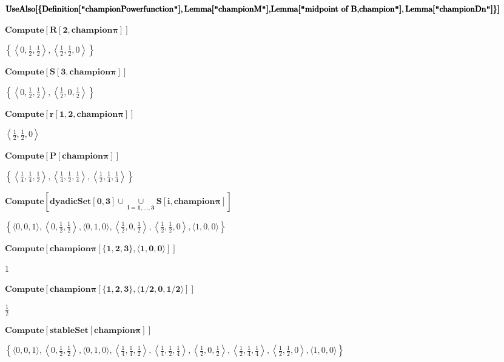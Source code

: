 \documentclass{article}
\begin{document}
\noindent\(\pmb{\text{UseAlso}[\{\text{Definition}[\text{$\texttt{"}$championPowerfunction$\texttt{"}$}],\text{Lemma}[\text{$\texttt{"}$championM$\texttt{"}$}],}\\
\pmb{\text{Lemma}[\text{$\texttt{"}$midpoint of B,champion$\texttt{"}$}],\text{Lemma}[\text{$\texttt{"}$championDn$\texttt{"}$}]\}]}\)

\noindent\(\pmb{\text{Compute}[R[2,\text{champion$\pi $}]]}\)

\noindent\(\left\{\left\langle 0,\frac{1}{2},\frac{1}{2}\right\rangle ,\left\langle \frac{1}{2},\frac{1}{2},0\right\rangle \right\}\)

\noindent\(\pmb{\text{Compute}[S[3,\text{champion$\pi $}]]}\)

\noindent\(\left\{\left\langle 0,\frac{1}{2},\frac{1}{2}\right\rangle ,\left\langle \frac{1}{2},0,\frac{1}{2}\right\rangle \right\}\)

\noindent\(\pmb{\text{Compute}[r[1,2,\text{champion$\pi $}]]}\)

\noindent\(\left\langle \frac{1}{2},\frac{1}{2},0\right\rangle \)

\noindent\(\pmb{\text{Compute}[P[\text{champion$\pi $}]]}\)

\noindent\(\left\{\left\langle \frac{1}{4},\frac{1}{4},\frac{1}{2}\right\rangle ,\left\langle \frac{1}{4},\frac{1}{2},\frac{1}{4}\right\rangle ,\left\langle
\frac{1}{2},\frac{1}{4},\frac{1}{4}\right\rangle \right\}\)

\noindent\(\pmb{\text{Compute}\left[\text{dyadicSet}[0,3]\cup \underset{i=1,\ldots ,3}{\cup }S[i,\text{champion$\pi $}]\right]}\)

\noindent\(\left\{\langle 0,0,1\rangle ,\left\langle 0,\frac{1}{2},\frac{1}{2}\right\rangle ,\langle 0,1,0\rangle ,\left\langle \frac{1}{2},0,\frac{1}{2}\right\rangle
,\left\langle \frac{1}{2},\frac{1}{2},0\right\rangle ,\langle 1,0,0\rangle \right\}\)

\noindent\(\pmb{\text{Compute}[\text{champion$\pi $}[\{1,2,3\},\langle 1,0,0\rangle ]]}\)

\noindent\(1\)

\noindent\(\pmb{\text{Compute}[\text{champion$\pi $}[\{1,2,3\},\langle 1/2,0,1/2\rangle ]]}\)

\noindent\(\frac{1}{2}\)

\noindent\(\pmb{\text{Compute}[\text{stableSet}[\text{champion$\pi $}]]}\)

\noindent\(\left\{\langle 0,0,1\rangle ,\left\langle 0,\frac{1}{2},\frac{1}{2}\right\rangle ,\langle 0,1,0\rangle ,\left\langle \frac{1}{4},\frac{1}{4},\frac{1}{2}\right\rangle
,\left\langle \frac{1}{4},\frac{1}{2},\frac{1}{4}\right\rangle ,\left\langle \frac{1}{2},0,\frac{1}{2}\right\rangle ,\left\langle \frac{1}{2},\frac{1}{4},\frac{1}{4}\right\rangle
,\left\langle \frac{1}{2},\frac{1}{2},0\right\rangle ,\langle 1,0,0\rangle \right\}\)
\end{document}
